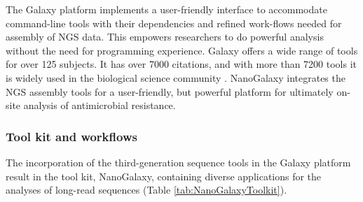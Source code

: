 \documentclass[a4paper,num-refs]{oup-contemporary}
\begin{document}
The Galaxy platform implements a user-friendly interface to accommodate command-line tools with their dependencies and refined work-flows needed for assembly of NGS data. This empowers researchers to do powerful analysis without the need for programming experience. Galaxy offers a wide range of tools for over 125 subjects. It has over 7000 citations, and with more than 7200 tools it is widely used in the biological science community \cite{Galaxycitations, Galaxytoolshed}. NanoGalaxy integrates the NGS assembly tools for a user-friendly, but powerful platform for ultimately on-site analysis of antimicrobial resistance.

\subsubsection{Tool kit and workflows}
The incorporation of the third-generation sequence tools in the Galaxy platform result in the tool kit, NanoGalaxy, containing diverse applications for the analyses of long-read sequences (Table \ref{tab:NanoGalaxyToolkit}).
\end{document}

